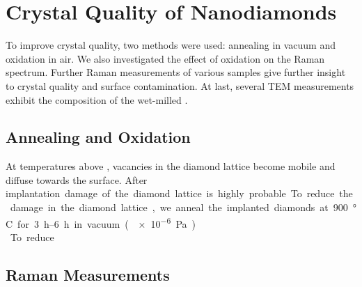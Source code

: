 
\chapter{Crystal Quality of Nanodiamonds}	\label{ch::crystal_quality}

To improve crystal quality, two methods were used: annealing in vacuum and oxidation in air.
We also investigated the effect of oxidation on the Raman spectrum.
Further Raman measurements of various samples give further insight to crystal quality and surface contamination.
At last, several TEM measurements exhibit the composition of the wet-milled \nds. 

	\section{Annealing and Oxidation}\label{sec::ann_ox}

	At temperatures above , vacancies in the diamond lattice become mobile and diffuse towards the surface\cite{}.
	After \si implantation damage of the diamond lattice is highly probable.
	To reduce the damage in the diamond lattice, we anneal the implanted diamonds at \SI{900}{\celsius} for \SIrange{3}{6}{h} in vacuum (\SI{e-6}{Pa}).
	\\
	To reduce 


	\section{Raman Measurements} \label{sec::raman}


